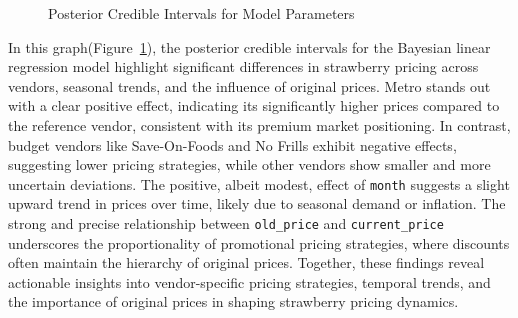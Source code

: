 \documentclass[
  letterpaper,
  DIV=11,
  numbers=noendperiod]{scrartcl}
\begin{document}
\begin{figure}


\caption{\label{fig-CI}Posterior Credible Intervals for Model
Parameters}

\end{figure}%

In this graph(Figure~\ref{fig-CI}), the posterior credible intervals for
the Bayesian linear regression model highlight significant differences
in strawberry pricing across vendors, seasonal trends, and the influence
of original prices. Metro stands out with a clear positive effect,
indicating its significantly higher prices compared to the reference
vendor, consistent with its premium market positioning. In contrast,
budget vendors like Save-On-Foods and No Frills exhibit negative
effects, suggesting lower pricing strategies, while other vendors show
smaller and more uncertain deviations. The positive, albeit modest,
effect of \texttt{month} suggests a slight upward trend in prices over
time, likely due to seasonal demand or inflation. The strong and precise
relationship between \texttt{old\_price} and \texttt{current\_price}
underscores the proportionality of promotional pricing strategies, where
discounts often maintain the hierarchy of original prices. Together,
these findings reveal actionable insights into vendor-specific pricing
strategies, temporal trends, and the importance of original prices in
shaping strawberry pricing dynamics.
\end{document}
